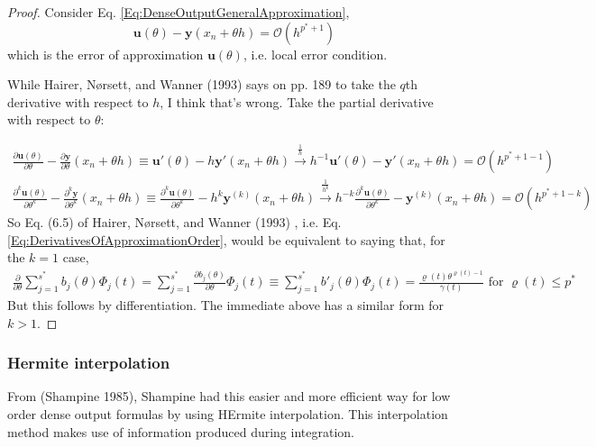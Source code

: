 \documentclass[10pt]{amsart}
\begin{document}
\begin{multicols*}{2}
\begin{proof}
Consider Eq. \ref{Eq:DenseOutputGeneralApproximation},
\[
\mathbf{u}(\theta) - \mathbf{y}(x_n + \theta h) = \mathcal{O}(h^{p^* + 1})
\] which is the error of approximation $\mathbf{u}(\theta)$, i.e. local error condition.

While Hairer, N\o rsett, and Wanner (1993) \cite{HNW1993} says on pp. 189 to take the $q$th derivative with respect to $h$, I think that's wrong. Take the partial derivative with respect to $\theta$:

\[
\begin{gathered}
	\frac{\partial \mathbf{u}(\theta) }{ \partial \theta} - \frac{ \partial \mathbf{y}}{\partial \theta}(x_n + \theta h) \equiv \mathbf{u}'(\theta) -h \mathbf{y}'(x_n + \theta h) \xrightarrow{ \frac{1}{h} } h^{-1} \mathbf{u}'(\theta) - \mathbf{y}'(x_n + \theta h) = \mathcal{O}(h^{p^* + 1 - 1}) \\
	\frac{ \partial^k \mathbf{u}(\theta) }{ \partial \theta^k } - \frac{ \partial^k \mathbf{y} }{ \partial \theta^k} (x_n + \theta h) \equiv \frac{ \partial^k \mathbf{u}(\theta) }{\partial \theta^k} - h^k \mathbf{y}^{(k)}(x_n + \theta h) \xrightarrow{ \frac{1}{h^k} } h^{-k} \frac{ \partial^k \mathbf{u}(\theta) }{ \partial \theta^k} - \mathbf{y}^{(k)} (x_n + \theta h) = \mathcal{O}(h^{p^* + 1 -k})
\end{gathered}
\]
So Eq. (6.5) of Hairer, N\o rsett, and Wanner (1993) \cite{HNW1993}, i.e. Eq. \ref{Eq:DerivativesOfApproximationOrder}, would be equivalent to saying that, for the $k=1$ case,
\[
\begin{gathered}
	\frac{\partial}{\partial \theta} \sum_{j=1}^{s^*} b_j(\theta) \Phi_j(t) = \sum_{j=1}^{s^*} \frac{\partial b_j(\theta) }{\partial \theta} \Phi_j(t) \equiv \sum_{j=1}^{s^*} b'_j(\theta) \Phi_j(t) = \frac{ \varrho (t) \theta^{\varrho (t) - 1} }{ \gamma(t)} \text{ for } \varrho(t) \leq p^*
\end{gathered}
\]
But this follows by differentiation. The immediate above has a similar form for $k>1$.

\end{proof}

\subsubsection{Hermite interpolation}

From (Shampine 1985), Shampine had this easier and more efficient way for low order dense output formulas by using HErmite interpolation. This interpolation method makes use of information produced during integration.


\end{multicols*}
\end{document}
